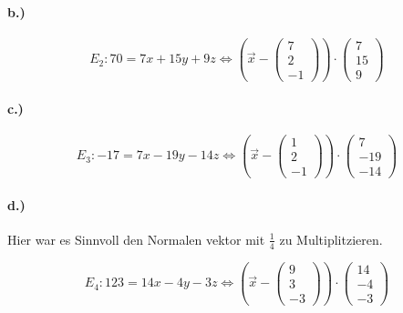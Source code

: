\documentclass{article}
\begin{document}
\paragraph*{b.)}

\begin{equation}
	E_2 : 70 = 7x + 15y + 9z \Leftrightarrow (\overrightarrow{x} - \begin{pmatrix}7\\2\\-1\end{pmatrix} ) \cdot \begin{pmatrix}7\\15\\9\end{pmatrix}  
\end{equation}

\paragraph*{c.)}

\begin{equation}
	E_3 : -17 = 7x - 19y - 14z \Leftrightarrow (\overrightarrow{x} - \begin{pmatrix}1\\2\\-1\end{pmatrix} ) \cdot \begin{pmatrix}7\\-19\\-14\end{pmatrix}  
\end{equation}

\paragraph*{d.)}

Hier war es Sinnvoll den Normalen vektor mit \( \frac{1}{4} \) zu Multiplitzieren.

\begin{equation}
	E_4 : 123 = 14x - 4y - 3z \Leftrightarrow (\overrightarrow{x} - \begin{pmatrix}9\\3\\-3\end{pmatrix} ) \cdot \begin{pmatrix}14\\-4\\-3\end{pmatrix}  
\end{equation}
\end{document}
